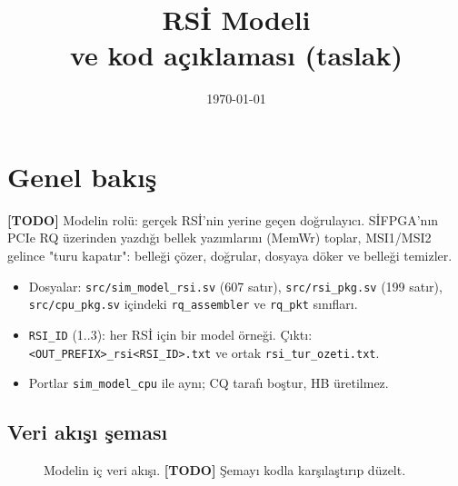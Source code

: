 \documentclass[11pt,a4paper]{article}
\title{\textbf{RSİ Modeli}\\[0.3em]\large \kod{sim\_model\_rsi.sv} ve \kod{rsi\_pkg.sv}
       kod açıklaması (taslak)}
\author{}
\date{\today}
\newcommand{\kod}[1]{\texttt{#1}}
\newcommand{\todo}[1]{\textcolor{red!60!black}{\textbf{[TODO]} #1}}
\begin{document}
\maketitle
\tableofcontents
\newpage

\section{Genel bakış}

\todo{Modelin rolü: gerçek RSİ'nin yerine geçen doğrulayıcı. SİFPGA'nın PCIe RQ
üzerinden yazdığı bellek yazımlarını (MemWr) toplar, MSI1/MSI2 gelince "turu kapatır":
belleği çözer, doğrular, dosyaya döker ve belleği temizler.}

\begin{itemize}[nosep]
  \item Dosyalar: \kod{src/sim\_model\_rsi.sv} (607 satır), \kod{src/rsi\_pkg.sv}
        (199 satır), \kod{src/cpu\_pkg.sv} içindeki \kod{rq\_assembler} ve
        \kod{rq\_pkt} sınıfları.
  \item \kod{RSI\_ID} (1..3): her RSİ için bir model örneği. Çıktı:
        \kod{<OUT\_PREFIX>\_rsi<RSI\_ID>.txt} ve ortak \kod{rsi\_tur\_ozeti.txt}.
  \item Portlar \kod{sim\_model\_cpu} ile aynı; CQ tarafı boştur, HB üretilmez.
\end{itemize}

\subsection{Veri akışı şeması}

\begin{figure}[h]
\centering
{}
\caption{Modelin iç veri akışı. \todo{Şemayı kodla karşılaştırıp düzelt.}}
\end{figure}
\end{document}
